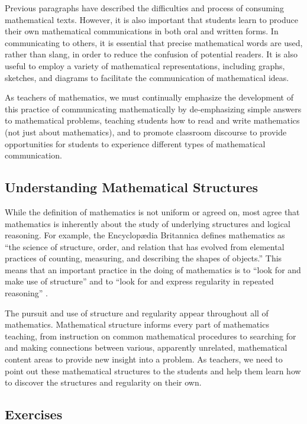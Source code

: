 \documentclass[
]{book}
\theoremstyle{definition}
\theoremstyle{definition}
\theoremstyle{definition}
\theoremstyle{definition}
\theoremstyle{remark}
\begin{document}
Previous paragraphs have described the difficulties and process of consuming mathematical texts. However, it is also important that students learn to produce their own mathematical communications in both oral and written forms. In communicating to others, it is essential that precise mathematical words are used, rather than slang, in order to reduce the confusion of potential readers. It is also useful to employ a variety of mathematical representations, including graphs, sketches, and diagrams to facilitate the communication of mathematical ideas.

As teachers of mathematics, we must continually emphasize the development of this practice of communicating mathematically by de-emphasizing simple answers to mathematical problems, teaching students how to read and write mathematics (not just about mathematics), and to promote classroom discourse to provide opportunities for students to experience different types of mathematical communication.

\hypertarget{understanding-mathematical-structures}{%
\subsection{Understanding Mathematical Structures}\label{understanding-mathematical-structures}}

While the definition of mathematics is not uniform or agreed on, most agree that mathematics is inherently about the study of underlying structures and logical reasoning. For example, the Encyclopædia Britannica \citeyearpar{definition} defines mathematics as ``the science of structure, order, and relation that has evolved from elemental practices of counting, measuring, and describing the shapes of objects.'' This means that an important practice in the doing of mathematics is to ``look for and make use of structure'' and to ``look for and express regularity in repeated reasoning'' \citep{CCSS}.

The pursuit and use of structure and regularity appear throughout all of mathematics. Mathematical structure informs every part of mathematics teaching, from instruction on common mathematical procedures to searching for and making connections between various, apparently unrelated, mathematical content areas to provide new insight into a problem. As teachers, we need to point out these mathematical structures to the students and help them learn how to discover the structures and regularity on their own.

\hypertarget{exercises-1}{%
\subsection{Exercises}\label{exercises-1}}
\end{document}
